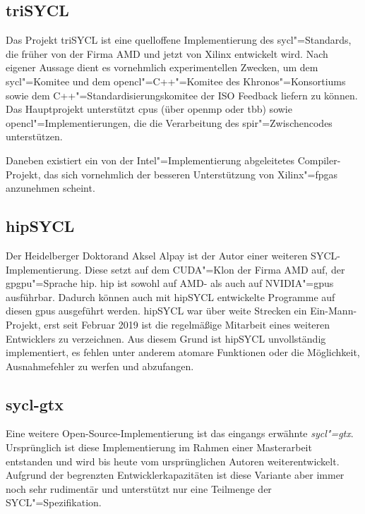 \subsection{triSYCL}

Das Projekt triSYCL ist eine quelloffene Implementierung des
\gls{sycl}"=Standards, die früher von der Firma AMD und jetzt von Xilinx
entwickelt wird. Nach eigener Aussage dient es vornehmlich experimentellen
Zwecken, um dem \gls{sycl}"=Komitee und dem \gls{opencl}"=C++"=Komitee des
Khronos"=Konsortiums sowie dem C++"=Standardisierungskomitee der ISO Feedback
liefern zu können. Das Hauptprojekt unterstützt \gls{cpu}s (über \gls{openmp}
oder \gls{tbb}) sowie \gls{opencl}"=Implementierungen, die die Verarbeitung des
\gls{spir}"=Zwischencodes unterstützen. \cite[vgl.][]{trisycl}

Daneben existiert ein von der Intel"=Implementierung abgeleitetes
Compiler-Projekt, das sich vornehmlich der besseren Unterstützung von
Xilinx"=\gls{fpga}s anzunehmen scheint. \cite[vgl.][]{trisyclclang}

\subsection{hipSYCL}

Der Heidelberger Doktorand Aksel Alpay ist der Autor einer weiteren
SYCL-Implementierung. Diese setzt auf dem CUDA"=Klon der Firma AMD auf, der
\gls{gpgpu}"=Sprache \gls{hip}. \gls{hip} ist sowohl auf AMD- als auch auf
NVIDIA"=\gls{gpu}s ausführbar. Dadurch können auch mit hipSYCL entwickelte
Programme auf diesen \gls{gpu}s ausgeführt werden. hipSYCL war über weite
Strecken ein Ein-Mann-Projekt, erst seit Februar 2019 ist die regelmäßige
Mitarbeit eines weiteren Entwicklers zu verzeichnen. Aus diesem Grund ist
hipSYCL unvollständig implementiert, es fehlen unter anderem atomare Funktionen
oder die Möglichkeit, Ausnahmefehler zu werfen und abzufangen.
\cite[vgl.][]{hipsycl}

\subsection{sycl-gtx}

Eine weitere Open-Source-Implementierung ist das eingangs erwähnte
\textit{sycl"=gtx}. Ursprünglich ist diese Implementierung im Rahmen einer
Masterarbeit entstanden \cite[vgl.][]{zuzek2016} und wird bis heute vom
ursprünglichen Autoren weiterentwickelt. Aufgrund der begrenzten
Entwicklerkapazitäten ist diese Variante aber immer noch sehr rudimentär und
unterstützt nur eine Teilmenge der SYCL"=Spezifikation.

